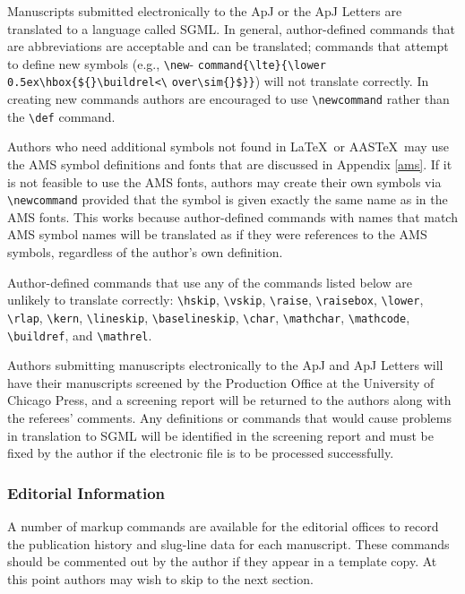 Manuscripts submitted electronically to the ApJ or the
ApJ Letters are translated to a language called SGML. 
In general, author-defined commands that are
abbreviations are acceptable and can be translated;
commands that attempt to define new symbols (e.g.,
\verb"\new"- \linebreak \verb"command{\lte}{\lower 0.5ex\hbox{${}\buildrel<\" \linebreak \verb"over\sim{}$}}") 
will not translate correctly. In creating new commands authors are 
encouraged to use \verb"\newcommand" rather than the \verb"\def" command. 
 
Authors who need additional symbols not found in \LaTeX\
or AAS\TeX\ may use the AMS symbol definitions and fonts
that are discussed in Appendix \ref{ams}.  If it is not
feasible to use the AMS fonts, authors may create their
own symbols via \verb"\newcommand" provided that the
symbol is given exactly the same name as in the AMS
fonts.  This works because author-defined commands with
names that match AMS symbol names will be translated as
if they were references to the AMS symbols, regardless
of the author's own definition.  
 
Author-defined commands that use any of the commands
listed below are unlikely to translate correctly:
\verb"\hskip", \verb"\vskip", \verb"\raise",
\verb"\raisebox", \verb"\lower",
\verb"\rlap", \verb"\kern", \verb"\lineskip",
\verb"\baselineskip",
\verb"\char", \verb"\mathchar", \verb"\mathcode",
\verb"\buildref", and
\verb"\mathrel".
 
Authors submitting manuscripts electronically to the
ApJ and ApJ Letters will have their manuscripts screened
by the Production Office at the University of Chicago
Press, and a screening report will be returned to the
authors along with the referees' comments.  Any
definitions or commands that would cause problems in
translation to SGML will be identified in the screening
report and must be fixed by the author if the electronic
file is to be processed successfully.

\subsubsection{Editorial Information}

A number of markup commands are available for the 
editorial offices to record the publication history and slug-line data for each
manuscript.  These commands should be commented out by the author if they 
appear in a template copy.  At this point authors may wish to skip to the 
next section.

